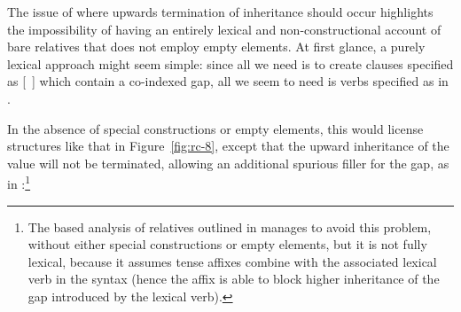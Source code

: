 \documentclass[output=paper
 	        ,biblatex
                ,babelshorthands
                ,newtxmath
                ,draftmode
                ,colorlinks, citecolor=brown
]{langscibook}
\begin{document}
The issue of where upwards termination of  inheritance should occur
highlights the impossibility of having an entirely lexical and non-constructional account
of bare relatives that does not employ empty elements. At first glance, a purely lexical
approach might seem
simple: since all we need is to create clauses specified as [~] which contain a
co-indexed gap, all we seem to need is verbs specified as in .
\begin{exe}\ex\label{x:rc-97}
\end{exe}
In the absence of special constructions or empty elements, this would license structures
like that in Figure~\ref{fig:rc-8}, except that the upward inheritance of the  value will not be
terminated, allowing an additional spurious filler for the gap, as in
:\footnote{The  based analysis of  relatives outlined in
  \cite{SiraiGunjiRelative} manages to avoid this problem, without either special
  constructions or empty elements, but it is not fully lexical, because it assumes 
  tense affixes combine with the associated lexical verb in the syntax (hence the affix is
  able to block higher inheritance of the gap introduced by the lexical verb).}
\begin{exe}
\end{exe} 
\end{document}
